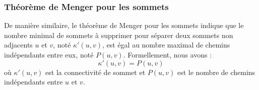 \begin{frame}
\frametitle{Théorème de Menger pour les sommets}
\begin{tcolorbox}[colback=orange!10,colframe=orange!100!black,
    title=Interconnexion et Indépendance: Le Théorème de Menger pour les Sommets]
   De manière similaire, le théorème de Menger pour les sommets indique que le nombre minimal de sommets à supprimer pour séparer deux sommets non adjacents \( u \) et \( v \), noté \( \kappa'(u, v) \), est égal au nombre maximal de chemins indépendants entre eux, noté \( P(u, v) \). Formellement, nous avons :
   $$ \kappa'(u, v) = P(u, v) $$
   où \( \kappa'(u, v) \) est la connectivité de sommet et \( P(u, v) \) est le nombre de chemins indépendants entre \( u \) et \( v \).
\end{tcolorbox}
\end{frame}
